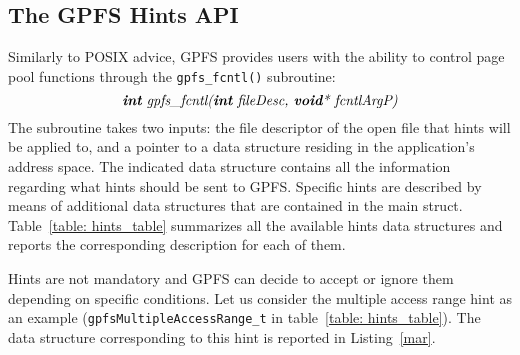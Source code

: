 \subsection{The GPFS Hints API}
\label{subsec: gpfs_hints_api}
Similarly to POSIX advice, GPFS provides users with the ability to control page pool functions through the \texttt{gpfs\_fcntl()} subroutine: $$\textit{\textbf{int} gpfs\_fcntl(\textbf{int} fileDesc, \textbf{void}* fcntlArgP)}$$ The subroutine takes two inputs: the file descriptor of the open file that hints will be applied to, and a pointer to a data structure residing in the application's address space. The indicated data structure contains all the information regarding what hints should be sent to GPFS. Specific hints are described by means of additional data structures that are contained in the main struct. Table~\ref{table: hints_table} summarizes all the available hints data structures and reports the corresponding description for each of them.

\begin{table}[h]
    \caption{Data structures provided by GPFS to describe different hints}
\centering
{}
\label{table: hints_table}
\end{table}  

Hints are not mandatory and GPFS can decide to accept or ignore them depending on specific conditions. Let us consider the multiple access range hint as an example (\texttt{gpfsMultipleAccessRange\_t} in table~\ref{table: hints_table}). The data structure corresponding to this hint is reported in Listing~\ref{mar}. \\
\\
\\

